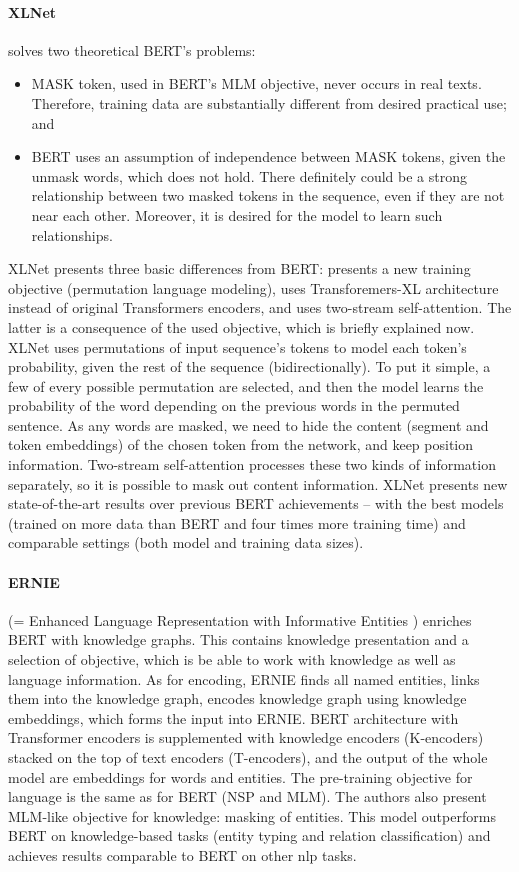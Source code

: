 \paragraph{XLNet} \citep{Yang2019a} solves two theoretical BERT's problems:
\begin{itemize}
\item MASK token, used in BERT's MLM objective, never occurs in real texts. Therefore, training data are substantially different from desired practical use; and
\item BERT uses an assumption of independence between MASK tokens, given the unmask words, which does not hold. There definitely could be a strong relationship between two masked tokens in the sequence, even if they are not near each other. Moreover, it is desired for the model to learn such relationships.
\end{itemize}
XLNet presents three basic differences from BERT: presents a new training objective (permutation language modeling), uses Transforemers-XL \citep{Dai2019} architecture instead of original Transformers encoders, and uses two-stream self-attention. The latter is a consequence of the used objective, which is briefly explained now. XLNet uses permutations of input sequence's tokens to model each token's probability, given the rest of the sequence (bidirectionally). To put it simple, a few of every possible permutation are selected, and then the model learns the probability of the word depending on the previous words in the permuted sentence. As any words are masked, we need to hide the content (segment and token embeddings) of the chosen token from the network, and keep position information. Two-stream self-attention processes these two kinds of information separately, so it is possible to mask out content information. XLNet presents new state-of-the-art results over previous BERT achievements -- with the best models (trained on more data than BERT and four times more training time) and comparable settings (both model and training data sizes).
\paragraph{ERNIE} (= Enhanced Language Representation with Informative Entities \citep{Zhang2019}) enriches BERT with knowledge graphs. This contains knowledge presentation and a selection of objective, which is be able to work with knowledge as well as language information. As for encoding, ERNIE finds all named entities, links them into the knowledge graph, encodes knowledge graph using knowledge embeddings, which forms the input into ERNIE. BERT architecture with Transformer encoders is supplemented with knowledge encoders (K-encoders) stacked on the top of text encoders (T-encoders), and the output of the whole model are embeddings for words and entities. The pre-training objective for language is the same as for BERT (NSP and MLM). The authors also present MLM-like objective for knowledge: masking of entities. This model outperforms BERT on knowledge-based tasks (entity typing and relation classification) and achieves results comparable to BERT on other \acrshort{nlp} tasks.
